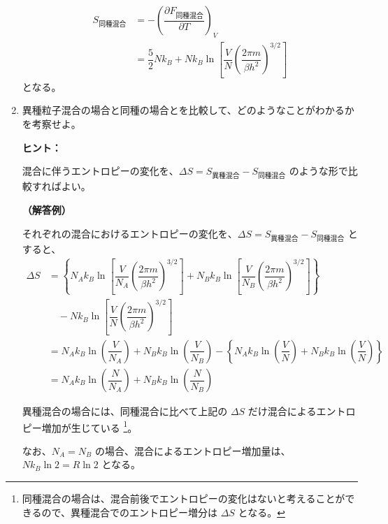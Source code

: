\documentclass[uplatex,dvipdfmx,a4paper,11pt]{jsarticle}
\begin{document}
\begin{enumerate}
\begin{align*}
S_{\text{同種混合}}
	&= -\left(\dfrac{\partial F_{\text{同種混合}}}{\partial T} \right)_V \\
	&= \dfrac{5}{2} N k_B + N k_B \ln \left[ \dfrac{V}{N}\left(\dfrac{2 \pi m}{\beta h^2} \right)^{3/2} \right]
\end{align*}
となる。

\newpage

\item
異種粒子混合の場合と同種の場合とを比較して、どのようなことがわかるかを考察せよ。
\vspace{8pt}
\begin{itembox}[l]{{\bf ヒント：}}

混合に伴うエントロピーの変化を、$\Delta S= S_{\text{異種混合}} - S_{\text{同種混合}}$ のような形で比較すればよい。

\end{itembox}
\vspace{8pt}

{\bf （解答例）}

それぞれの混合におけるエントロピーの変化を、$\Delta S= S_{\text{異種混合}} - S_{\text{同種混合}}$ とすると、
\begin{align*}
\Delta S
	&= \left \{ N_A k_B \ln \left[ \dfrac{V}{N_A}\left(\dfrac{2 \pi m}{\beta h^2} \right)^{3/2} \right] 
	+ N_B k_B \ln \left[ \dfrac{V}{N_B}\left(\dfrac{2 \pi m}{\beta h^2} \right)^{3/2} \right] \right\} \\
	&\quad - N k_B \ln \left[ \dfrac{V}{N}\left(\dfrac{2 \pi m}{\beta h^2} \right)^{3/2} \right] \\
	&= N_A k_B \ln \left( \dfrac{V}{N_A} \right) + N_B k_B \ln \left( \dfrac{V}{N_B} \right) 
	-\left \{ N_A k_B \ln \left( \dfrac{V}{N} \right) + N_B k_B \ln \left( \dfrac{V}{N} \right) \right\} \\
	&= N_A k_B \ln \left( \dfrac{N}{N_A} \right) + N_B k_B \ln \left( \dfrac{N}{N_B} \right)
\end{align*}

異種混合の場合には、同種混合に比べて上記の $\Delta S$ だけ混合によるエントロピー増加が生じている
\footnote{
同種混合の場合は、混合前後でエントロピーの変化はないと考えることができるので、異種混合でのエントロピー増分は $\Delta S$ となる。
}。

なお、$N_A = N_B$ の場合、混合によるエントロピー増加量は、$N k_B \ln2 = R \ln2$ となる。

\end{enumerate}

\newpage
\end{document}
